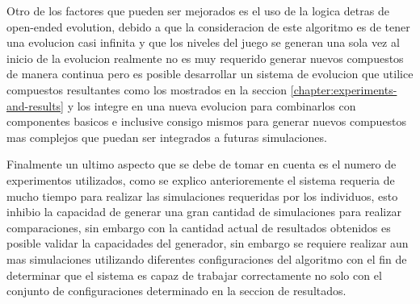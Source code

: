 Otro de los factores que pueden ser mejorados es el uso de la logica detras de
open-ended evolution, debido a que la consideracion de este algoritmo es de
tener una evolucion casi infinita y que los niveles del juego se generan una
sola vez al inicio de la evolucion realmente no es muy requerido generar nuevos
compuestos de manera continua pero es posible desarrollar un sistema de
evolucion que utilice compuestos resultantes como los mostrados en la seccion
\ref{chapter:experiments-and-results} y los integre en una nueva evolucion para
combinarlos con componentes basicos e inclusive consigo mismos para generar
nuevos compuestos mas complejos que puedan ser integrados a futuras
simulaciones.

Finalmente un ultimo aspecto que se debe de tomar en cuenta es el numero de
experimentos utilizados, como se explico anterioremente el sistema requeria de
mucho tiempo para realizar las simulaciones requeridas por los individuos, esto
inhibio la capacidad de generar una gran cantidad de simulaciones para realizar
comparaciones, sin embargo con la cantidad actual de resultados obtenidos es
posible validar la capacidades del generador, sin embargo se requiere realizar
aun mas simulaciones utilizando diferentes configuraciones del algoritmo con el
fin de determinar que el sistema es capaz de trabajar correctamente no solo con
el conjunto de configuraciones determinado en la seccion de resultados.